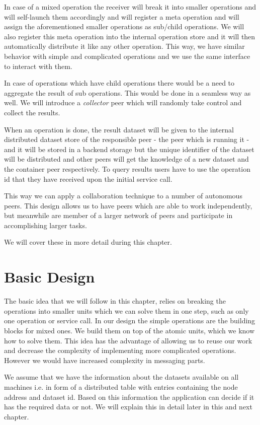In case of a mixed operation the receiver will break it into smaller operations and will self-launch them accordingly and
will register a meta operation and will assign the aforementioned smaller operations as sub/child operations. We will
also register this meta operation into the internal operation store and it will then automatically distribute it like any other
operation. This way, we have similar behavior with simple and complicated operations and we use the same interface to interact
with them.

In case of operations which have child operations there would be a need to aggregate the result of sub operations.
This would be done in a seamless way as well. We will introduce a \textit{collector} peer which will randomly take control
and collect the results.

When an operation is done, the result dataset will be given to the internal distributed dataset store of the responsible
peer - the peer which is running it - and it will be stored in a backend storage but the unique identifier of the dataset
will be distributed and other peers will get the knowledge of a new dataset and the container peer respectively. 
To query results users have to use the operation id that they have received upon the initial service call. 

This way we can apply a collaboration technique to a number of autonomous peers. 
This design allows us to have peers which are able to work independently, 
but meanwhile are member of a larger network of peers and participate in accomplishing larger tasks.

We will cover these in more detail during this chapter.

\section{Basic Design}
The basic idea that we will follow in this chapter, relies on breaking the operations into smaller units which
we can solve them in one step, such as only one operation or service call. 
In our design the simple operations are the building blocks for mixed ones.
We build them on top of the atomic units, which we know how to solve them.
This idea has the advantage of allowing us to reuse our work and decrease the complexity of implementing
more complicated operations. However we would have increased complexity in messaging parts.

We assume that we have the information about the datasets
available on all machines i.e. in form of a distributed table
with entries containing the node address and dataset id. Based on this
information the application can decide if it has the required data or
not. We will explain this in detail later in this and next chapter.

